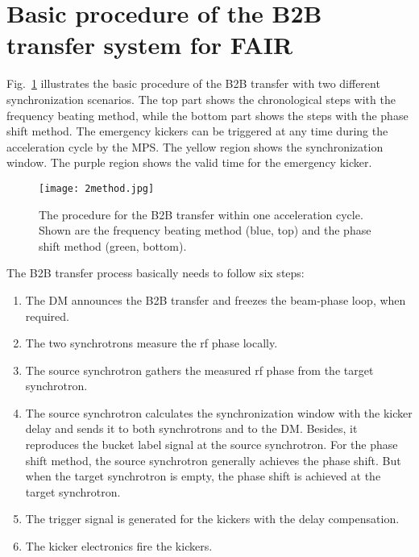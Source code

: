 \section{Basic procedure of the B2B transfer system for FAIR}

Fig.~\ref{2method} illustrates the basic procedure of the B2B transfer with two different synchronization scenarios. The top part shows the chronological steps with the frequency beating method, while the bottom part shows the steps with the phase shift method. The emergency kickers can be triggered at any time during the acceleration cycle by the MPS. The yellow region shows the synchronization window. The purple region shows the valid time for the emergency kicker. 
\begin{figure}[H]
   \centering   
   \texttt{[image: 2method.jpg]}
   \caption{The procedure for the B2B transfer within one acceleration cycle. Shown are the frequency beating method (blue, top) and the phase shift method (green, bottom).}
   \label{2method}
\end{figure}

The B2B transfer process basically needs to follow six steps:
\begin{enumerate}
\item The DM announces the B2B transfer and freezes the beam-phase loop, when required.
\item The two synchrotrons measure the rf phase locally.
\item The source synchrotron gathers the measured rf phase from the target synchrotron.
\item The source synchrotron calculates the synchronization window with the kicker delay and sends it to both synchrotrons and to the DM. Besides, it reproduces the bucket label signal at the source synchrotron.
For the phase shift method, the source synchrotron generally achieves the phase shift. But when the target synchrotron is empty, the phase shift is achieved at the target synchrotron.
\item The trigger signal is generated for the kickers with the delay compensation.
\item The kicker electronics fire the kickers.
\end{enumerate}

